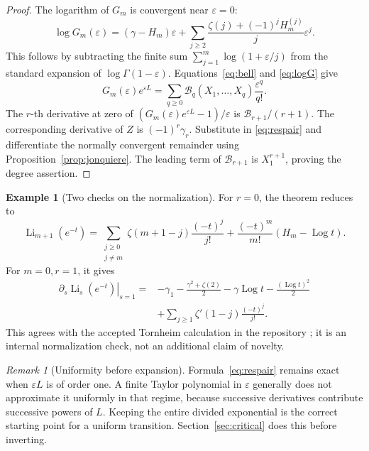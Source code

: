 \documentclass[11pt,a4paper]{article}
\numberwithin{equation}{section}
\theoremstyle{definition}
\newtheorem{example}[theorem]{Example}
\theoremstyle{remark}
\newtheorem{remark}[theorem]{Remark}
\DeclareMathOperator{\Li}{Li}
\DeclareMathOperator{\Log}{Log}
\newcommand{\eps}{\varepsilon}
\begin{document}
\begin{proof}
The logarithm of \(G_m\) is convergent near \(\eps=0\):
\begin{equation}
 \log G_m(\eps)
 =(\gamma-H_m)\eps+
 \sum_{j\ge2}
 \frac{\zeta(j)+(-1)^jH_m^{(j)}}{j}\eps^j.
 \label{eq:logG}
\end{equation}
This follows by subtracting the finite sum
\(\sum_{j=1}^m\log(1+\eps/j)\) from the standard expansion of
\(\log\Gamma(1-\eps)\).
Equations~\eqref{eq:bell} and \eqref{eq:logG} give
\[
 G_m(\eps)e^{\eps L}
 =\sum_{q\ge0}\mathcal B_q(X_1,\ldots,X_q)\frac{\eps^q}{q!}.
\]
The \(r\)-th derivative at zero of
\((G_m(\eps)e^{\eps L}-1)/\eps\) is
\(\mathcal B_{r+1}/(r+1)\).
The corresponding derivative of \(Z\) is
\((-1)^r\gamma_r\).
Substitute in \eqref{eq:respair} and differentiate the normally
convergent remainder using Proposition~\ref{prop:jonquiere}.
The leading term of \(\mathcal B_{r+1}\) is \(X_1^{r+1}\), proving the
degree assertion.
\end{proof}

\begin{example}[Two checks on the normalization]
For \(r=0\), the theorem reduces to
\begin{equation}
 \Li_{m+1}(e^{-t})
 =\sum_{\substack{j\ge0\\j\ne m}}
 \zeta(m+1-j)\frac{(-t)^j}{j!}
 +\frac{(-t)^m}{m!}(H_m-\Log t).
 \label{eq:intpoly}
\end{equation}
For \(m=0,r=1\), it gives
\begin{align*}
 \left.\partial_s\Li_s(e^{-t})\right|_{s=1}
 ={}&-\gamma_1-\frac{\gamma^2+\zeta(2)}2
       -\gamma\Log t-\frac{(\Log t)^2}{2}\\
 &+\sum_{j\ge1}\zeta'(1-j)\frac{(-t)^j}{j!}.
\end{align*}
This agrees with the accepted Tornheim calculation in the repository
\cite{repo-poly}; it is an internal normalization check, not an additional
claim of novelty.
\end{example}

\begin{remark}[Uniformity before expansion]
Formula~\eqref{eq:respair} remains exact when
\(\eps L\) is of order one.  A finite Taylor polynomial in \(\eps\)
generally does not approximate it uniformly in that regime, because
successive derivatives contribute successive powers of \(L\).
Keeping the entire divided exponential is the correct starting point
for a uniform transition.  Section~\ref{sec:critical} does this before
inverting.
\end{remark}
\end{document}
